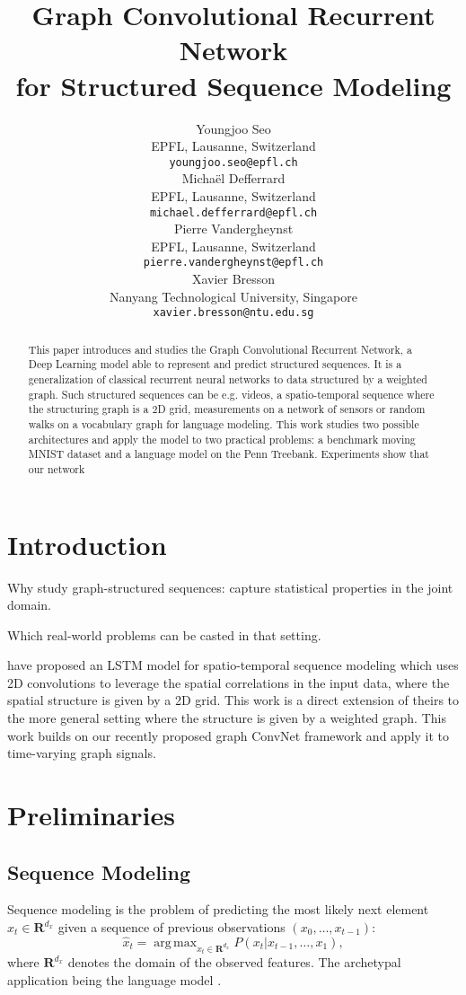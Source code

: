 \documentclass{article} %
\title{Graph Convolutional Recurrent Network\\
for Structured Sequence Modeling}
\author{Youngjoo Seo \\
EPFL, Lausanne, Switzerland \\
\texttt{youngjoo.seo@epfl.ch} \\
\And
Michaël Defferrard \\
EPFL, Lausanne, Switzerland \\
\texttt{michael.defferrard@epfl.ch} \\
\And
Pierre Vandergheynst \\
EPFL, Lausanne, Switzerland \\
\texttt{pierre.vandergheynst@epfl.ch} \\
\And
Xavier Bresson \\
Nanyang Technological University, Singapore \\
\texttt{xavier.bresson@ntu.edu.sg} \\
}
\DeclareMathOperator*{\argmax}{arg\,max}
\newcommand{\todo}[1]{{\color{red} #1 }}
\begin{document}
\maketitle

\begin{abstract}
	This paper introduces and studies the Graph Convolutional Recurrent
	Network, a Deep Learning model able to represent and predict structured
	sequences. It is a generalization of classical recurrent neural networks to
	data structured by a weighted graph.
	Such structured sequences can be e.g. videos, a spatio-temporal sequence
	where the structuring graph is a 2D grid, measurements on a network of
	sensors or random walks on a vocabulary graph for language modeling.
	This work studies two possible architectures and apply the model to two
	practical problems: a benchmark moving MNIST dataset and a language model
	on the Penn Treebank. Experiments \todo{show that our network}
\end{abstract}

\section{Introduction}

\todo{Why study graph-structured sequences: capture statistical properties in
the joint domain.}

\todo{Which real-world problems can be casted in that setting.}

\citet{convlstm} have proposed an LSTM model for spatio-temporal sequence
modeling which uses 2D convolutions to leverage the spatial correlations in the
input data, where the spatial structure is given by a 2D grid. This work is a
direct extension of theirs to the more general setting where the structure is
given by a weighted graph. This work builds on our recently proposed graph
ConvNet framework \citep{graphcnn} and apply it to time-varying graph signals.

\section{Preliminaries}

\subsection{Sequence Modeling}

Sequence modeling is the problem of predicting the most likely next element
$\hat{x}_t \in \mathbf{R}^{d_x}$ given a sequence of previous observations
$(x_0, \ldots, x_{t-1})$:
\begin{equation} \label{eqn:seq}
	\hat{x}_t = \argmax_{x_t \in \mathbf{R}^{d_x}} P(x_t | x_{t-1}, \ldots, x_1),
\end{equation}
where $\mathbf{R}^{d_x}$ denotes the domain of the observed features. The
archetypal application being the language model \citep{seq_graves}.
\end{document}

